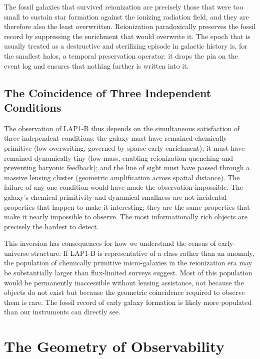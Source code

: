 \documentclass[12pt, a4paper]{article}
\theoremstyle{definition}
\begin{document}
The fossil galaxies that survived reionization are precisely those that were
too small to sustain star formation against the ionizing radiation field, and
they are therefore also the least overwritten. Reionization paradoxically
preserves the fossil record by suppressing the enrichment that would overwrite
it. The epoch that is usually treated as a destructive and sterilizing
episode in galactic history is, for the smallest halos, a temporal
preservation operator: it drops the pin on the event log and ensures that
nothing further is written into it.

\subsection{The Coincidence of Three Independent Conditions}

The observation of LAP1-B thus depends on the simultaneous satisfaction of
three independent conditions: the galaxy must have remained chemically
primitive (low overwriting, governed by sparse early enrichment); it must
have remained dynamically tiny (low mass, enabling reionization quenching
and preventing baryonic feedback); and the line of sight must have passed
through a massive lensing cluster (geometric amplification across spatial
distance). The failure of any one condition would have made the observation
impossible. The galaxy's chemical primitivity and dynamical smallness are
not incidental properties that happen to make it interesting; they are the
same properties that make it nearly impossible to observe. The most
informationally rich objects are precisely the hardest to detect.

This inversion has consequences for how we understand the census of
early-universe structure. If LAP1-B is representative of a class rather
than an anomaly, the population of chemically primitive micro-galaxies in
the reionization era may be substantially larger than flux-limited surveys
suggest. Most of this population would be permanently inaccessible without
lensing assistance, not because the objects do not exist but because the
geometric coincidence required to observe them is rare. The fossil record of
early galaxy formation is likely more populated than our instruments can
directly see.

\section{The Geometry of Observability}
\label{sec:clio}
\end{document}

